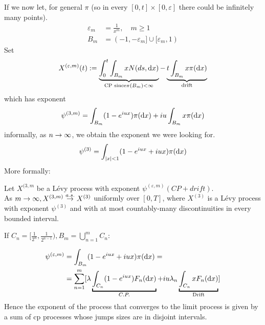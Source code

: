 \documentclass[class=article,crop=false]{standalone}
\begin{document}
If we now let, for general $\pi$ (so in every $[0,t] \times [0,\varepsilon]$ there could be infinitely many points).
\begin{align*}
	\varepsilon_m &= \frac{1}{x^m}, \quad m \geq 1\\
	B_m &= (-1, - \varepsilon_m] \cup [\varepsilon_m, 1)
\end{align*}
Set 
\begin{equation*}
	X^{(\varepsilon,m)}(t) := \underbrace{\int_0^t\int_{B_m} x N(ds,\mathop{}\!\mathrm{d} x)}_{\text{CP since} \pi(B_m)<\infty} - \underbrace{t \int_{B_m}x\pi(\mathop{}\!\mathrm{d} x)}_{\text{drift}}
\end{equation*}
which has exponent 
\begin{equation*}
	\psi^{(3,m)} = \int_{B_m}(1-e^{iux}) \pi(\mathop{}\!\mathrm{d} x) + iu \int_{B_m} x \pi(\mathop{}\!\mathrm{d} x)
\end{equation*}
informally, as $n \rightarrow \infty$, we obtain the exponent we were looking for. \\
\begin{equation*}
	\psi^{(3)}= \int_{|x|<1}(1-e^{iux} + iux)\pi(\mathop{}\!\mathrm{d} x)
\end{equation*}
More formally:
\begin{proposition}
	Let $X^{(3,m}$ be a L\'evy process with exponent $\psi^{(\varepsilon,m)}(CP + drift)$.\\
	As $m \rightarrow \infty, X^{(3,m)} \stackrel{a.s.} {\rightarrow} X^{(3)}$ uniformly over $[0,T]$, where $X^{(3)}$ is a L\'evy process with exponent $\psi^{(3)}$ and with at most countably-many discontinuities in every bounded interval.
\end{proposition}
If $C_n = [\frac{1}{2^n},\frac{1}{2^{n-1}}), B_m = \bigcup_{n = 1} ^ m C_n$:\\
\begin{figure}[H]
	\centering
	
\end{figure}
\begin{align*}
	\psi^{(\varepsilon,m)} &=\int_{B_m}(1-e^{iux}+iux)\pi(\dif x)=\\
	&=\sum_{n=1}^m[\lambda\underbracket{\int_{C_n}(1-e^{iux})F_n(\dif x)}_{C.P.}+ iu \lambda_n\underbracket{\int_{C_n}x F_n(\dif x)}_{\text{Drift}}]
\end{align*}
Hence the exponent of the process that converges to the limit process is given by a sum of cp processes whose jumps sizes are in disjoint intervals.
\end{document}
